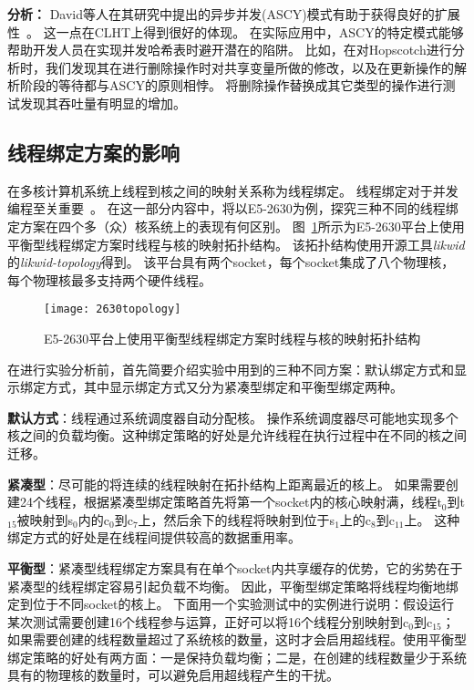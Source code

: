 \textbf{分析：} David等人在其研究中提出的异步并发(ASCY)模式有助于获得良好的扩展性~\cite{clht}。
这一点在CLHT上得到很好的体现。
在实际应用中，ASCY的特定模式能够帮助开发人员在实现并发哈希表时避开潜在的陷阱。
比如，在对Hopscotch进行分析时，我们发现其在进行删除操作时对共享变量所做的修改，以及在更新操作的解析阶段的等待都与ASCY的原则相悖。
将删除操作替换成其它类型的操作进行测试发现其吞吐量有明显的增加。

\subsection{线程绑定方案的影响}
\label{sec:thread_pinning}
在多核计算机系统上线程到核之间的映射关系称为线程绑定。
线程绑定对于并发编程至关重要~\cite{pinning}。
在这一部分内容中，将以E5-2630为例，探究三种不同的线程绑定方案在四个多（众）核系统上的表现有何区别。
图~\ref{fig:2630topology}所示为E5-2630平台上使用平衡型线程绑定方案时线程与核的映射拓扑结构。
该拓扑结构使用开源工具\textit{likwid}\cite{likwid}的\textit{likwid-topology}得到。
该平台具有两个socket，每个socket集成了八个物理核，每个物理核最多支持两个硬件线程。

\begin{figure}[htbp]
\centering
\texttt{[image: 2630topology]}
\caption{E5-2630平台上使用平衡型线程绑定方案时线程与核的映射拓扑结构}
\label{fig:2630topology}
\end{figure}

在进行实验分析前，首先简要介绍实验中用到的三种不同方案：默认绑定方式和显示绑定方式，其中显示绑定方式又分为紧凑型绑定和平衡型绑定两种。

\textbf{默认方式}：线程通过系统调度器自动分配核。
操作系统调度器尽可能地实现多个核之间的负载均衡。这种绑定策略的好处是允许线程在执行过程中在不同的核之间迁移。

\textbf{紧凑型}：尽可能的将连续的线程映射在拓扑结构上距离最近的核上。
如果需要创建24个线程，根据紧凑型绑定策略首先将第一个socket内的核心映射满，线程t$_0$到t$_{15}$被映射到s$_0$内的c$_0$到c$_7$上，然后余下的线程将映射到位于s$_1$上的c$_8$到c$_{11}$上。
这种绑定方式的好处是在线程间提供较高的数据重用率。

\textbf{平衡型}：紧凑型线程绑定方案具有在单个socket内共享缓存的优势，它的劣势在于紧凑型的线程绑定容易引起负载不均衡。
因此，平衡型绑定策略将线程均衡地绑定到位于不同socket的核上。
下面用一个实验测试中的实例进行说明：假设运行某次测试需要创建16个线程参与运算，正好可以将16个线程分别映射到c$_0$到c$_{15}$；
如果需要创建的线程数量超过了系统核的数量，这时才会启用超线程。使用平衡型绑定策略的好处有两方面：一是保持负载均衡；二是，在创建的线程数量少于系统具有的物理核的数量时，可以避免启用超线程产生的干扰。


